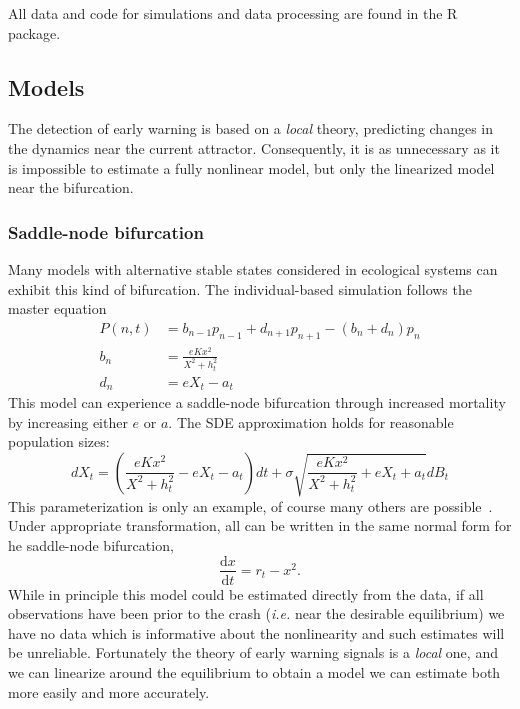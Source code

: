 \documentclass{pnastwo}
\newcommand{\ud}{\mathrm{d}}
\begin{document}
\begin{article}
\begin{materials}
All data and code for simulations and data processing are found in the R package.  

                             \end{materials}

                             \appendix 
                             \subsection{Models}
The detection of early warning is based on a \emph{local} theory,
predicting changes in the dynamics near the current attractor.
Consequently, it is as unnecessary as it is impossible to estimate a fully nonlinear model,
but only the linearized model near the bifurcation.

\subsubsection{Saddle-node bifurcation}
Many models with alternative stable states considered in ecological systems can exhibit this kind of bifurcation.
The individual-based simulation follows the master equation  
\begin{align}
  P(n,t) &= b_{n-1} p_{n-1} + d_{n+1}p_{n+1} - (b_n+d_n)p_n  \label{master} \\ 
  b_n &= \frac{e K x^2}{X^2 + h_t^2} \nonumber \\ 
  d_n &= e X_t - a_t   \nonumber
\end{align}
This model can experience a saddle-node bifurcation through increased mortality by increasing either $e$ or $a$. 
The SDE approximation holds for reasonable population sizes:
\begin{equation}
dX_t = \left( \frac{e K x^2}{X^2 + h_t^2} - e X_t - a_t\right) dt + \sigma \sqrt{ \frac{e K x^2}{X^2 + h_t^2} + e X_t + a_t} dB_t \label{ass}
\end{equation}
This parameterization is only an example, of course many others are possible~\cite{Scheffer2009, Scheffer2001, Strogatz2001a, Guckenheimer1983}. 
Under appropriate transformation, all can be written in the same normal form for he saddle-node bifurcation,
\begin{equation}
\frac{\ud x}{\ud t} = r_t- x^2.
\label{saddle-node}
\end{equation}
While in principle this model could be estimated directly from the data,
if all observations have been prior to the crash (\emph{i.e.} near the desirable equilibrium)
we have no data which is informative about the nonlinearity and such estimates will be unreliable.  
Fortunately the theory of early warning signals is a \emph{local} one, 
and we can linearize around the equilibrium to obtain a model we can estimate both more easily and more accurately.  


\end{article}
\end{document}
